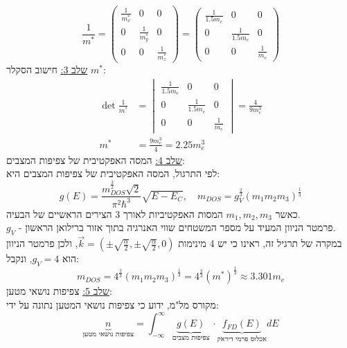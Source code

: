 \documentclass{article}
\begin{document}
\begin{Answer}
\begin{equation*}
    \frac{1}{m^{*}}=\begin{pmatrix}
        \frac{1}{m_{x}^{*}} & 0 & 0\\
        0 & \frac{1}{m_{y}^{*}} & 0\\
        0 & 0 & \frac{1}{m_{z}^{*}}
    \end{pmatrix}= \begin{pmatrix}
        \frac{1}{1.5m_{e}} & 0 & 0\\
        0 & \frac{1}{1.5m_{e}} & 0\\
        0 & 0 & \frac{1}{m_{e}}
    \end{pmatrix}
\end{equation*}
\underline{שלב 3:} חישוב הסקלר $m^{*}$:
\begin{align*}
    \det{\frac{1}{m^{*}}}&=\begin{vmatrix}
        \frac{1}{1.5m_{e}} & 0 & 0\\
        0 & \frac{1}{1.5m_{e}} & 0\\
        0 & 0 & \frac{1}{m_{e}}
    \end{vmatrix} = \frac{4}{9 m_{e}^{3}}\\
    m^{*}&=\frac{9 m_{e}^{3}}{4}=2.25m_{e}^{3}
\end{align*}
\underline{שלב 4:} המסה האפקטיבית של צפיפות המצבים:\\
לפי התרגול, המסה האפקטיבית של צפיפות המצבים היא:
\begin{equation}\label{המסה האפקטיבית של צפיפות מצבים}
    g(E)=\frac{m_{DOS}^{\frac{3}{2}}\sqrt{2}}{\pi^{2}\hbar^{3}}\sqrt{E-E_{C}},\quad m_{DOS}=g_{V}^{\frac{2}{3}}\left( m_{1}m_{2}m_{3} \right)^{\frac{1}{3}}
\end{equation}
כאשר $m_{1},m_{2},m_{3}$ המסות האפקטיביות לאורך 3 הצירים הראשיים של הבעיה.\\
$g_{V}$ - פרמטר הניוון המעיד על מספר המשטחים שווי האנרגיה בתוך אזור ברילואן הראשון.\\
במקרה של תרגיל זה, ראינו כי יש 4 מינימות $\vec{k}=\left( \pm\sqrt{\frac{\alpha}{2}},\pm\sqrt{\frac{\alpha}{2}},0 \right)$, ולכן פרמטר הניוון הוא $g_{V}=4$, ונקבל:
$$m_{DOS}=4^{\frac{2}{3}}\left( m_{1}m_{2}m_{3} \right)^{\frac{1}{3}}=4^{\frac{2}{3}}\left( m^{*} \right)^{\frac{1}{3}}\approx3.301m_{e}$$
\underline{שלב 5:} צפיפות נושאי מטען:\\
מקורס מל"מ, ידוע כי צפיפות נושאי המטען נתונה על ידי:
\begin{equation}\label{צפיפות נושאי מטען}
    \underbrace{n}_{\text{צפיפות נושאי מטען}}=\int_{-\infty}^{\infty}\underbrace{g(E)}_{\text{צפיפות מצבים}}\,\cdot\underbrace{f_{FD}{(E)}}_{\text{אכלוס פרמי דיראק}}dE

\end{equation}
\end{Answer}
\end{document}
